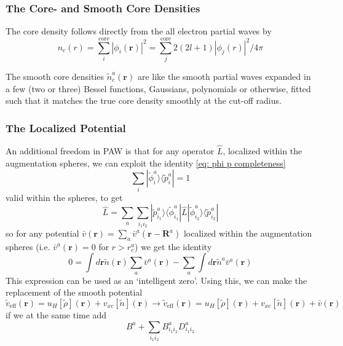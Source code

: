 \documentclass[a4paper]{article}
\newcommand{\f}[1]{\mathbf{#1}}
\newcommand{\s}[1]{\tilde{#1}}
\newcommand{\wh}[1]{\widehat{#1}}
\newcommand{\br}{\mathbf{r}}
\newcommand{\bR}{\mathbf{R}}
\newcommand{\bra}[1]{\langle #1 |}
\newcommand{\ket}[1]{| #1 \rangle}
\begin{document}
\subsubsection*{The Core- and Smooth Core Densities }
The core density follows directly from the all electron partial waves by
%
\begin{equation}\label{eq: core density}
n_c(r) = \sum_i^\text{core} |\phi_i(\br)|^2 = \sum_j^\text{core} 2(2l+1) |\phi_j(r)|^2 / 4\pi
\end{equation}
% 
\par The smooth core densities $\s{n}_c^a(\br)$ are like the smooth
partial waves expanded in a few (two or three) Bessel functions,
Gaussians, polynomials or otherwise, fitted such that it matches the
true core density smoothly at the cut-off radius.

\subsubsection*{The Localized Potential}
An additional freedom in PAW is that for any operator $\wh{L}$,
localized within the augmentation spheres, we can exploit the identity
\ref{eq: phi p completeness}
%
\begin{equation}
\sum_i \ket{\s{\phi}_i^a}\bra{\s{p}_i^a} = 1 %
\end{equation}
%
valid within the spheres, to get
%
\begin{equation*}
  \wh{L} = \sum_a \sum_{i_1i_2} \ket{\s{p}^a_{i_1}}\bra{\s{\phi}_{i_1}^a}\wh{L} \ket{\s{\phi}_{i_2}^a}\bra{\s{p}^a_{i_2}}
\end{equation*}
%
so for any potential $\bar{v}(\br) = \sum_a \bar{v}^a(\br- \bR^a)$
localized within the augmentation spheres (i.e. $\bar{v}^a(\br) = 0$
for $r>r_c^a$) we get the identity
%
\begin{equation*}
  0 = \int d\br \s{n}(\br) \sum_a \bar{v}^a(\br) - \sum_a \int d\br \s{n}^a \bar{v}^a(\br)
\end{equation*}
%
This expression can be used as an `intelligent zero'. Using this, we
can make the replacement of the smooth potential
%
\begin{equation}
  \s{v}_\text{eff}(\br) = u_H[\s{\rho}](\br) + v_{xc}[\s{n}](\br) \to \s{v}_\text{eff}(\br) = u_H[\s{\rho}](\br) + v_{xc}[\s{n}](\br) + \bar{v}(\br)  
\end{equation}
%
if we at the same time add 
%
\begin{equation}
  B^a + \sum_{i_1i_2} B^a_{i_1i_2} D^a_{i_1i_2}
\end{equation}
\end{document}
